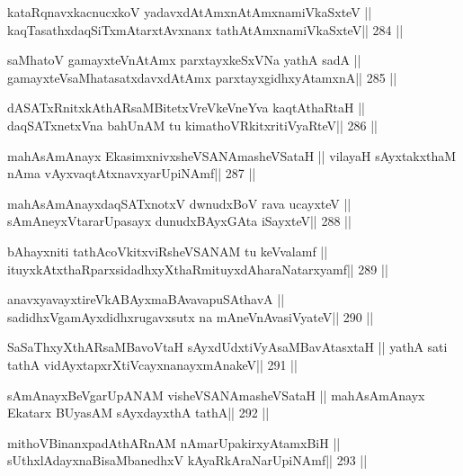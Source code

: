 \begin{shl}
kataRqnavxkacnucxkoV yadavxdAtAmx\s nAtAmxnamiVkaSxteV ||
kaqTasathxdaqSiTxmAtarxtAvxnanx tathA\s\s tAmxnamiVkaSxteV\hfill || 284 ||
\end{shl}

\begin{shl}
saMhatoV gamayxteV\s nAtAmx parxtayxkeSxVNa yathA sadA ||
gamayxteV\s saMhatasatxdavxdAtAmx parxtayxgidhxyA\s\s tamxnA\hfill || 285 ||
\end{shl}

\begin{shl}
dASATxRnitxkAthARsaMBitetxVreVkeVneYva kaqtAthaRtaH ||
daqSATxnetxVna bahUnAM tu kimathoVRkitxritiVyaRteV\hfill || 286 ||
\end{shl}

\begin{shl}
mahAsAmAnayx EkasimxnivxsheVSANAmasheVSataH ||
vilayaH sAyxtakxthaM nAma vAyxvaqtAtxnavxyarUpiNAmf\hfill || 287 ||
\end{shl}

\begin{shl}
mahAsAmAnayxdaqSATxnotxV dwnudxBoV rava ucayxteV ||
sAmAneyxVtararUpasayx dunudxBAyxGAta iSayxteV\hfill || 288 ||
\end{shl}

\begin{shl}
bAhayxniti tathAcoVkitxviRsheVSANAM tu keVvalamf ||
ituyxkAtxthaRparxsidadhxyXthaRmituyxdAharaNatarxyamf\hfill || 289 ||
\end{shl}

\begin{shl}
anavxyavayxtireVkABAyxmaBAvavapuSA\s thavA ||
sadidhxVgamAyxdidhxrugavxsutx na mAneVnAvasiVyateV\hfill || 290 ||
\end{shl}

\begin{shl}
SaSaThxyXthARsaMBavoV\s taH sAyxdUdxtiVyAsaMBavAtasxtaH ||
yathA sati tathA vidAyxtapxrXtiVcayxnanayxmAnakeV\hfill || 291 ||
\end{shl}

\begin{shl}
sAmAnayxBeVgarUpANAM visheVSANAmasheVSataH ||
mahAsAmAnayx Ekatarx BUyasAM sAyxdayxthA tathA\hfill || 292 ||
\end{shl}

\begin{shl}
mithoVBinanxpadAthARnAM nAmarUpakirxyAtamxBiH ||
sUthxlAdayxnaBisaMbanedhxV kAyaRkAraNarUpiNAmf\hfill || 293 ||
\end{shl}

